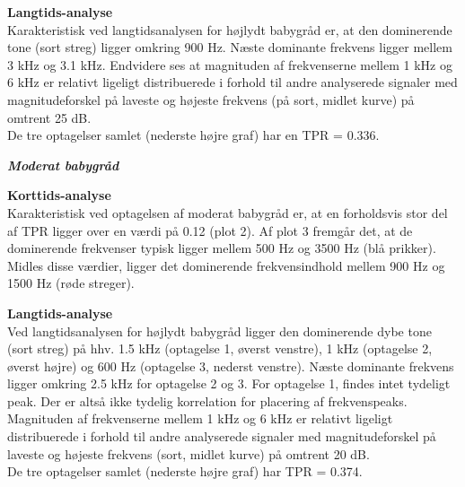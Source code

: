 
\newpage
\textbf{Langtids-analyse} \\
Karakteristisk ved langtidsanalysen for højlydt babygråd er, at den dominerende tone (sort streg) ligger omkring 900 Hz. Næste dominante frekvens ligger mellem 3 kHz og 3.1 kHz. Endvidere ses at magnituden af frekvenserne mellem 1 kHz og 6 kHz er relativt ligeligt distribuerede i forhold til andre analyserede signaler med magnitudeforskel på laveste og højeste frekvens (på sort, midlet kurve) på omtrent 25 dB. \\
De tre optagelser samlet (nederste højre graf) har en TPR = 0.336.



\newpage
\begin{center} \textit{\textbf{Moderat babygråd}} \end{center}
\textbf{Korttids-analyse} \\
Karakteristisk ved optagelsen af moderat babygråd er, at en forholdsvis stor del af TPR ligger over en værdi på 0.12 (plot 2). Af plot 3 fremgår det, at de dominerende frekvenser typisk ligger mellem 500 Hz og 3500 Hz (blå prikker). Midles disse værdier, ligger det dominerende frekvensindhold mellem 900 Hz og 1500 Hz (røde streger). 


\newpage
\textbf{Langtids-analyse} \\
Ved langtidsanalysen for højlydt babygråd ligger den dominerende dybe tone (sort streg) på hhv. 1.5 kHz (optagelse 1, øverst venstre), 1 kHz (optagelse 2, øverst højre) og 600 Hz (optagelse 3, nederst venstre). Næste dominante frekvens ligger omkring 2.5 kHz for optagelse 2 og 3. For optagelse 1, findes intet tydeligt peak. Der er altså ikke tydelig korrelation for placering af frekvenspeaks. Magnituden af frekvenserne mellem 1 kHz og 6 kHz er relativt ligeligt distribuerede i forhold til andre analyserede signaler med magnitudeforskel på laveste og højeste frekvens (sort, midlet kurve) på omtrent 20 dB. \\
De tre optagelser samlet (nederste højre graf) har TPR = 0.374.

